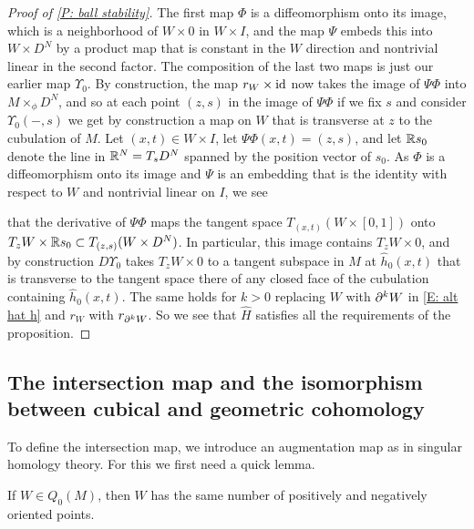 \begin{proof}[Proof of \cref{P: ball stability}]
	The first map $\Phi$ is a diffeomorphism onto its image, which is a neighborhood of $W \times 0$ in $W \times I$, and the map $\Psi$ embeds this into $W \times D^N$ by a product map that is constant in the $W$ direction and nontrivial linear in the second factor.
	The composition of the last two maps is just our earlier map $\Upsilon_0$.
	By construction, the map $r_W \times \mathrm{id}$ now takes the image of $\Psi\Phi$ into $M\times_\phi D^N$, and so at each point $(z,s)$ in the image of $\Psi\Phi$ if we fix $s$ and consider $\Upsilon_0(-,s)$ we get by construction a map on $W$ that is transverse at $z$ to the cubulation of $M$.
	Let $(x,t) \in W \times I$, let $\Psi \Phi(x,t) = (z,s)$, and let $\mathbb{R} s_0$ denote the line in $\mathbb{R}^N = T_sD^N$ spanned by the position vector of $s_0$.
	As $\Phi$ is a diffeomorphism onto its image and $\Psi$ is an embedding that is the identity with respect to $W$ and nontrivial linear on $I$, we see

	that the derivative of $\Psi\Phi$ maps the tangent space $T_{(x,t)}(W \times [0,1])$ onto $ T_zW \times \mathbb{R} s_0 \subset T_{(z,s)}(W \times D^N)$.
	In particular, this image contains $T_zW \times 0$, and by construction $D\Upsilon_0$ takes $T_zW \times 0$ to a tangent subspace in $M$ at $\hat h_0(x,t)$ that is transverse to the tangent space there of any closed face of the cubulation containing $\hat h_0(x,t)$.
	The same holds for $k>0$ replacing $W$ with $\partial^{k}W$ in \eqref{E: alt hat h} and $r_W$ with $r_{\partial^{k}W}$.
	So we see that $\hat H$ satisfies all the requirements of the proposition.
\end{proof}

\subsection{The intersection map and the isomorphism between cubical and geometric cohomology}\label{S: intersection map}

To define the intersection map, we introduce an augmentation map as in singular homology theory.
For this we first need a quick lemma.

\begin{lemma}\label{L: Q0}
	If $W \in Q_0(M)$, then $W$ has the same number of positively and negatively oriented points.
\end{lemma}

